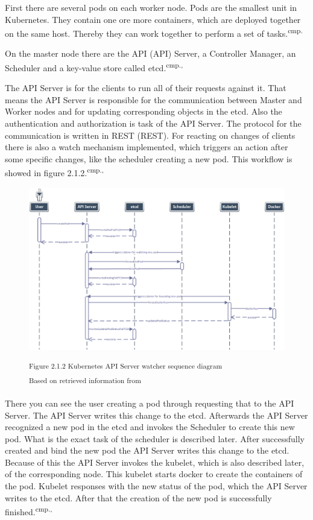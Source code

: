 First there are several pods on each worker node. Pods are the smallest unit in Kubernetes. They contain one ore more containers, which are deployed together on the same host. Thereby they can work together to perform a set of tasks.\textsuperscript{cmp.\cite{15}}%

On the master node there are the \acs{API} (\acl{API}) Server, a Controller Manager, an Scheduler and a key-value store called etcd.\textsuperscript{cmp.\cite{13}, \cite{16}}

The API Server is for the clients to run all of their requests against it. That means the API Server is responsible for the communication between Master and Worker nodes and for updating corresponding objects in the etcd. Also the authentication and authorization is task of the API Server. The protocol for the communication is written in \acs{REST} (\acl{REST}). For reacting on changes of clients there is also a watch mechanism implemented, which triggers an action after some specific changes, like the scheduler creating a new pod. This workflow is showed in figure 2.1.2.\textsuperscript{cmp.\cite{13}, \cite{16}}

\begin{figure}[h]
\centering
\includegraphics[width=\textwidth]{images/kubernetes_watcher_sequence.png}

\textsuperscript{Figure 2.1.2 Kubernetes API Server watcher sequence diagram}\\
\textsuperscript{Based on retrieved information from \cite{16}}
\end{figure}

There you can see the user creating a pod through requesting that to the API Server. The API Server writes this change to the etcd. Afterwards the API Server recognized a new pod in the etcd and invokes the Scheduler to create this new pod. What is the exact task of the scheduler is described later. After successfully created and bind the new pod the API Server writes this change to the etcd. Because of this the API Server invokes the kubelet, which is also described later, of the corresponding node. This kubelet starts docker to create the containers of the pod. Kubelet responses with the new status of the pod, which the API Server writes to the etcd. After that the creation of the new pod is successfully finished.\textsuperscript{cmp.\cite{13}, \cite{16}}

